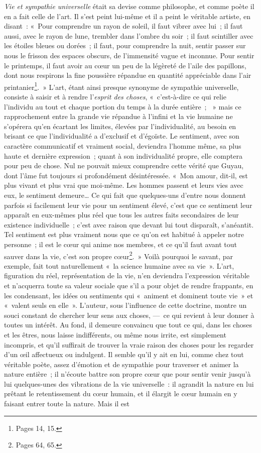 \documentclass[french,twoside]{book} %
\begin{document}
\noindent \emph{Vie et sympathie universelle} était sa devise comme philosophe, et comme poète il en a fait celle de l’art. Il s’est peint lui-même et il a peint le véritable artiste, en disant : « Pour comprendre un rayon de soleil, il faut vibrer avec lui ; il faut aussi, avec le rayon de lune, trembler dans l’ombre du soir ; il faut scintiller avec les étoiles bleues ou dorées ; il faut, pour comprendre la nuit, sentir passer sur nous le frisson des espaces obscurs, de l’immensité vague et inconnue. Pour sentir le printemps, il faut avoir au cœur un peu de la légèreté de l’aile des papillons, dont nous respirons la fine poussière répandue en quantité appréciable dans l’air printanier\footnote{Pages 14, 15.}. » L’art, étant ainsi presque synonyme de sympathie universelle, consiste à saisir et à rendre l’\emph{esprit des choses}, « c’est-à-dire ce qui relie l’individu au tout et chaque portion du temps à la durée entière ;  » mais ce rapprochement entre la grande vie répandue à l’infini et la vie humaine ne s’opérera qu’en écartant les limites, élevées par l’individualité, au besoin en brisant ce que l’individualité a d’exclusif et d’égoïste. Le sentiment, avec son caractère communicatif et vraiment social, deviendra l’homme même, sa plus haute et dernière expression ; quant à son individualité propre, elle comptera pour peu de chose. Nul ne pouvait mieux comprendre cette vérité que Guyau, dont l’âme fut toujours si profondément désintéressée. « Mon amour, dit-il, est plus vivant et plus vrai que moi-même. Les hommes passent et leurs vies avec eux, le sentiment demeure… Ce qui fait que quelques-uns d’entre nous donnent parfois si facilement leur vie pour un sentiment élevé, c’est que ce sentiment leur apparaît en eux-mêmes plus réel que tous les autres faits secondaires de leur existence individuelle ; c’est avec raison que devant lui tout disparaît, s’anéantit. Tel sentiment est plus vraiment nous que ce qu’on est habitué à appeler notre personne ; il est le cœur qui anime nos membres, et ce qu’il faut avant tout sauver dans la vie, c’est son propre cœur\footnote{Pages 64, 65.}. » Voilà pourquoi le savant, par exemple, fait tout naturellement « la science humaine avec sa vie ». L’art, figuration du réel, représentation de la vie, n’en deviendra l’expression véritable et n’acquerra toute sa valeur sociale que s’il a pour objet de rendre frappants, en les condensant, les idées ou sentiments qui « animent et dominent toute vie » et « valent seuls en elle ». L’auteur, sous l’influence de cette doctrine, montre un souci constant de chercher leur sens aux choses, — ce qui revient à leur donner à toutes un intérêt. Au fond, il demeure convaincu que tout ce qui, dans les choses et les êtres, nous laisse indifférents, ou même nous irrite, est simplement incompris, et qu’il suffirait de trouver la vraie raison des choses pour les regarder d’un œil affectueux ou indulgent. Il semble qu’il y ait en lui, comme chez tout véritable poète, assez d’émotion et de sympathie pour traverser et animer la nature entière ; il n’écoute battre son propre cœur que pour sentir venir jusqu’à lui quelques-unes des vibrations de la vie universelle : il agrandit la nature en lui prêtant le retentissement du cœur humain, et il élargit le cœur humain en y faisant entrer toute la nature. Mais il est 
\end{document}

